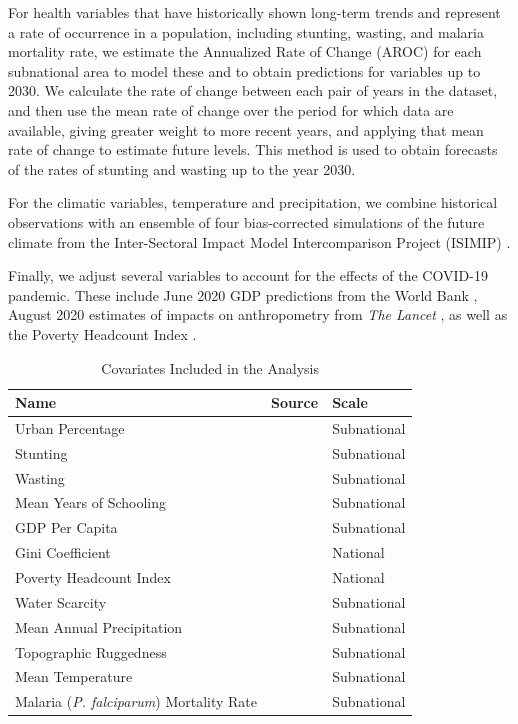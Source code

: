 \documentclass[titlepage]{article}
\begin{document}
For health variables that have historically shown long-term trends and represent a rate of occurrence in a population, including stunting, wasting, and malaria mortality rate, we estimate the Annualized Rate of Change (AROC) for each subnational area to model these and to obtain predictions for variables up to 2030. We calculate the rate of change between each pair of years in the dataset, and then use the mean rate of change over the period for which data are available, giving greater weight to more recent years, and applying that mean rate of change to estimate future levels.  This method is used to obtain forecasts of the rates of stunting and wasting up to the year 2030.

For the climatic variables, temperature and precipitation, we combine historical observations with an ensemble of four bias-corrected simulations of the future climate from the Inter-Sectoral Impact Model Intercomparison Project (ISIMIP) \citep{warszawski2014inter}.

Finally, we adjust several variables to account for the effects of the COVID-19 pandemic.  These include June 2020 GDP predictions from the World Bank \citep{prospects2020}, August 2020 estimates of impacts on anthropometry from \textit{The Lancet} \citep{headey2020impacts}, as well as the Poverty Headcount Index \cite{Cuaresma2018}.

\begin{table}[H]
  \centering
	\begin{tabular}{lll}
		\toprule
    Name & Source & Scale \\
		\midrule
    Urban Percentage & \citep{Jones2016} & Subnational \\
    Stunting & \citep{Local2020} & Subnational \\
    Wasting & \citep{Local2020} & Subnational \\
    Mean Years of Schooling & \citep{Smits2019, KC2017} & Subnational\\
    GDP Per Capita & \citep{Smits2019, Dellink2017} & Subnational \\
    Gini Coefficient & \citep{Rao2019a} & National\\
    Poverty Headcount Index & \citep{Cuaresma2018} & National \\
    Water Scarcity & \citep{greve2018global} & Subnational \\
    Mean Annual Precipitation &  \cite{abatzoglou2018terraclimate, warszawski2014inter} & Subnational \\
    Topographic Ruggedness &  \cite{USGS1996, Riley1999} & Subnational \\
    Mean Temperature &  \cite{abatzoglou2018terraclimate, warszawski2014inter} & Subnational \\
    Malaria (\textit{P. falciparum}) Mortality Rate &  \cite{Weiss2019} & Subnational \\
		\bottomrule
	\end{tabular}
	\caption{Covariates Included in the Analysis}
	\label{tab:covars}
\end{table}
\end{document}
